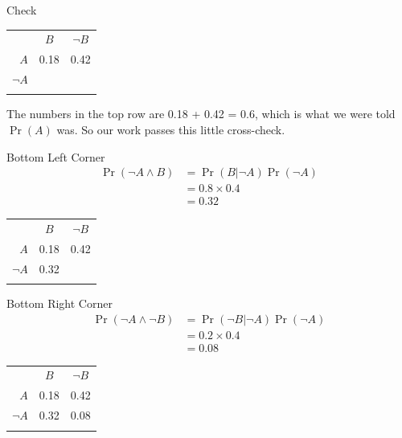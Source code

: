 \documentclass[
  ignorenonframetext,
]{beamer}
\renewcommand{\,}{\text{, }}
\begin{document}
\begin{frame}{Check}
\protect\hypertarget{check}{}
\begin{longtable}[]{@{}rcc@{}}
\toprule
& \(B\) & \(\neg B\) \\ \addlinespace
\midrule
\endhead
\(A\) & 0.18 & 0.42 \\ \addlinespace
\(\neg A\) & & \\ \addlinespace
\bottomrule
\end{longtable}

The numbers in the top row are 0.18 + 0.42 = 0.6, which is what we were
told \(\Pr(A)\) was. So our work passes this little cross-check.
\end{frame}

\begin{frame}{Bottom Left Corner}
\protect\hypertarget{bottom-left-corner}{}
\begin{align*}
\Pr(\neg A \wedge B) &= \Pr( B | \neg A) \Pr(\neg A) \\
 &= 0.8 \times 0.4 \\
 &= 0.32
\end{align*}

\pause

\begin{longtable}[]{@{}rcc@{}}
\toprule
& \(B\) & \(\neg B\) \\ \addlinespace
\midrule
\endhead
\(A\) & 0.18 & 0.42 \\ \addlinespace
\(\neg A\) & 0.32 & \\ \addlinespace
\bottomrule
\end{longtable}
\end{frame}

\begin{frame}{Bottom Right Corner}
\protect\hypertarget{bottom-right-corner}{}
\begin{align*}
\Pr(\neg A \wedge \neg B) &= \Pr( \neg B | \neg A) \Pr(\neg A) \\
 &= 0.2 \times 0.4 \\
 &= 0.08
\end{align*}

\pause

\begin{longtable}[]{@{}rcc@{}}
\toprule
& \(B\) & \(\neg B\) \\ \addlinespace
\midrule
\endhead
\(A\) & 0.18 & 0.42 \\ \addlinespace
\(\neg A\) & 0.32 & 0.08 \\ \addlinespace
\bottomrule
\end{longtable}
\end{frame}
\end{document}
